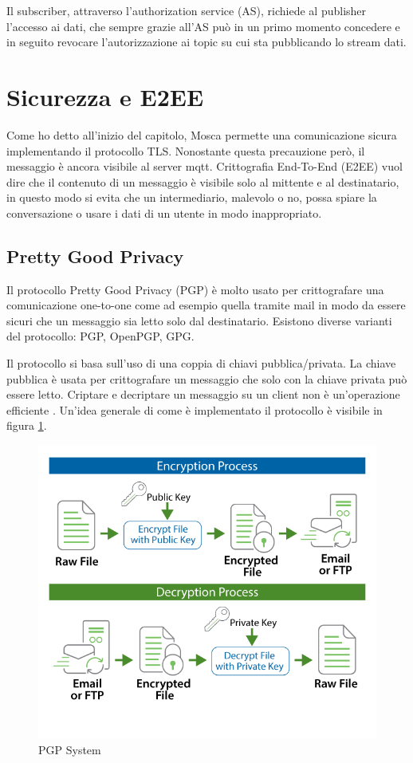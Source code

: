Il subscriber, attraverso l'authorization service (AS), richiede al publisher l'accesso ai dati, che sempre grazie all'AS può in un primo momento concedere e in seguito revocare l'autorizzazione ai topic su cui sta pubblicando lo stream dati.

\newpage
\section{Sicurezza e E2EE}
Come ho detto all'inizio del capitolo, Mosca permette una comunicazione sicura implementando il protocollo TLS. Nonostante questa precauzione però, il messaggio è ancora visibile al server mqtt. 
Crittografia End-To-End (E2EE) vuol dire che il contenuto di un messaggio è visibile solo al mittente e al destinatario, in questo modo si evita che un intermediario, malevolo o no, possa spiare la conversazione o usare i dati di un utente in modo inappropriato.
\subsection{Pretty Good Privacy}
Il protocollo Pretty Good Privacy (PGP) è molto usato per crittografare una comunicazione one-to-one come ad esempio quella tramite mail in modo da essere sicuri che un messaggio sia letto solo dal destinatario. Esistono diverse varianti del protocollo: PGP, OpenPGP, GPG. 

Il protocollo si basa sull'uso di una coppia di chiavi pubblica/privata. La chiave pubblica è usata per crittografare un messaggio che solo con la chiave privata può essere letto.
Criptare e decriptare un messaggio su un client non è un'operazione efficiente \cite{explainPGPEncryption}.
Un'idea generale di come è implementato il protocollo è visibile in figura \ref{fig:pgp}.
\begin{figure}
\begin{center}
  \includegraphics[width=1\textwidth]{images/OpenPGP.png}%
  \caption{PGP System \cite{OpenPGPgoanywhere}}
  \label{fig:pgp}
\end{center}
\end{figure}

